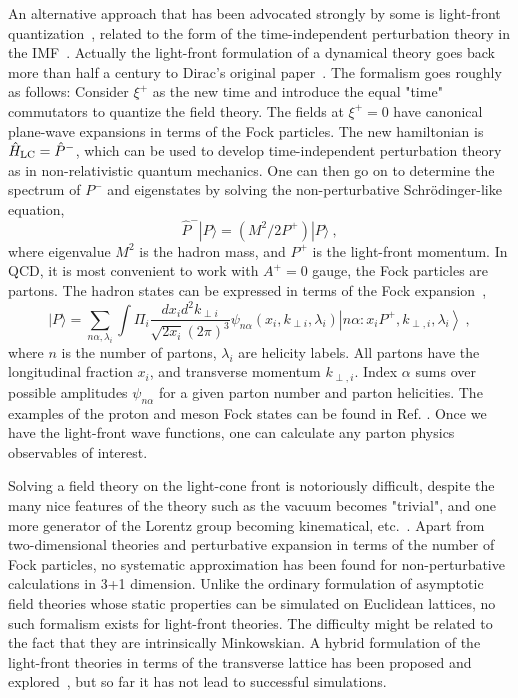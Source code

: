 \documentclass[aps,prd,preprint,tightenlines,superscriptaddress]{revtex4}
\begin{document}
An alternative approach that has been advocated strongly by some is light-front 
quantization~\cite{Ji:1992ku,Burkardt:1995ct,Brodsky:1997de},
related to the form of the time-independent perturbation theory in
the IMF~\cite{Weinberg:1966jm}. Actually the light-front formulation of a dynamical theory goes back
more than half a century to Dirac's original paper~\cite{Dirac:1949cp}.
The formalism goes roughly as follows: Consider $\xi^+$ as the new time and introduce the equal "time"
commutators to quantize the field theory. The fields at $\xi^+=0$ have canonical plane-wave expansions in terms of
the Fock particles. The new hamiltonian is $\hat H_{\rm LC}= \hat P^-$, which
can be used to develop time-independent perturbation theory as in non-relativistic quantum mechanics.  One can then go on
to determine the spectrum of $P^-$ and eigenstates by solving the non-perturbative Schr\"odinger-like equation,
\begin{equation}
      \hat P^-|P\rangle = (M^2/2P^+)|P\rangle \ ,
\end{equation}
where eigenvalue $M^2$ is the hadron mass, and $P^+$ is the light-front momentum.
In QCD, it is most convenient to work with $A^+=0$ gauge, the Fock particles are partons.
The hadron states can be expressed in terms of the Fock expansion~\cite{Brodsky:1997de},
\begin{equation}
             |P\rangle = \sum_{n\alpha, \lambda_i} \int \Pi_i \frac{dx_id^2k_{\perp i}}{\sqrt{2x_i}(2\pi)^3} \psi_{n\alpha}(x_i, k_{\perp i}, \lambda_i) \left|n\alpha
             : x_iP^+, k_{\perp,i},\lambda_i \right\rangle \ ,
\end{equation}
where $n$ is the number of partons, $\lambda_i$ are helicity labels. All partons have the longitudinal fraction $x_i$,
and transverse momentum $k_{\perp, i}$. Index $\alpha$ sums over possible amplitudes $\psi_{n\alpha}$ for a given parton number and
parton helicities. The examples of the proton and meson Fock states can be found in Ref. \cite{Ji:2002xn,Ji:2003yj}.
Once we have the light-front wave functions, one can calculate any parton physics observables of interest.

Solving a field theory on the light-cone front is notoriously difficult, despite the many nice features of the theory
such as the vacuum becomes "trivial", and one more generator of the Lorentz group
becoming kinematical, etc.~\cite{Brodsky:1997de}. Apart from two-dimensional theories and
perturbative expansion in terms of the number of Fock particles, no systematic
approximation has been found for non-perturbative calculations in 3+1 dimension. Unlike the ordinary
formulation of asymptotic field theories whose static properties can be simulated on Euclidean lattices,
no such formalism exists for light-front theories. The difficulty might be related to the fact that they 
are intrinsically Minkowskian. A hybrid formulation of
the light-front theories in terms of the transverse lattice has been proposed and explored~\cite{Bardeen:1979xx},
but so far it has not lead to successful simulations.
\end{document}
